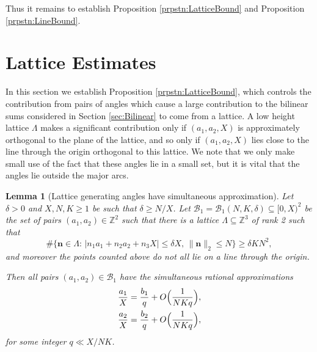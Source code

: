 \documentclass[10pt]{amsart}
\theoremstyle{plain}
\newtheorem{lmm}[thrm]{Lemma}
\numberwithin{sblmm}{thrm}
\numberwithin{equation}{section}
\begin{document}
%
%
%
%
Thus it remains to establish Proposition \ref{prpstn:LatticeBound} and Proposition \ref{prpstn:LineBound}.
%
%
%
%
%
%
%
\section{Lattice Estimates}\label{sec:Lattice}
%
%
%
%
In this section we establish Proposition \ref{prpstn:LatticeBound}, which controls the contribution from pairs of angles which cause a large contribution to the bilinear sums considered in Section \ref{sec:Bilinear} to come from a lattice. A low height lattice $\Lambda$ makes a significant contribution only if $(a_1,a_2,X)$ is approximately orthogonal to the plane of the lattice, and so only if $(a_1,a_2,X)$ lies close to the line through the origin orthogonal to this lattice. We note that we only make small use of the fact that these angles lie in a small set, but it is vital that the angles lie outside the major arcs.
%
%
%
%
\begin{lmm}[Lattice generating angles have simultaneous approximation]\label{lmm:LatticeApprox}
%
Let $\delta>0$ and $X,N,K\ge1$ be such that $\delta\ge N/X$. Let $\mathcal{B}_1=\mathcal{B}_1(N,K,\delta)\subseteq[0,X)^2$ be the set of pairs $(a_1,a_2)\in\mathbb{Z}^2$ such that there is a lattice $\Lambda\subseteq\mathbb{Z}^3$ of rank 2 such that
\[\#\{\mathbf{n}\in\Lambda:\,| n_1a_1+n_2a_2+n_3 X|\le \delta X,\,\|\mathbf{n}\|_2\le N\}\ge  \delta K N^2,\]
and moreover the points counted above do not all lie on a line through the origin.

Then all pairs $(a_1,a_2)\in\mathcal{B}_1$ have the simultaneous rational approximations
%
\begin{align*}
\frac{a_1}{X}&=\frac{b_1}{q}+O\Bigl(\frac{1}{N K q}\Bigr),\\
\frac{a_2}{X}&=\frac{b_2}{q}+O\Bigl(\frac{1}{N K q}\Bigr),
\end{align*}
%
for some integer $q\ll X/N K$.
%
\end{lmm}
\end{document}

